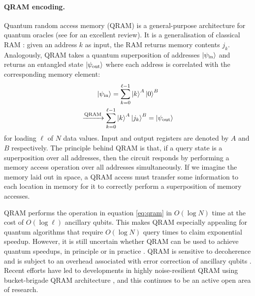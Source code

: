 \documentclass[10pt]{iopart}
\begin{document}
\paragraph{QRAM encoding.} Quantum random access memory (QRAM) is a general-purpose architecture for quantum oracles (see \cite{Jaques2023} for an excellent review). It is a generalisation of classical RAM \cite{Giovannetti2008,Giovannetti2008a}: given an address $k$ as input, the RAM returns memory contents $j_k$. Analogously, QRAM takes a quantum superposition of addresses $\ket{\psi_\text{in}}$ and returns an entangled state $\ket{\psi_\text{out}}$ where each address is correlated with the corresponding memory element:
\begin{gather}
\ket{\psi_\text{in}} =
\sum_{k=0}^{\ell-1} \ket{k}^A \ket{0}^B \nonumber\\
\xrightarrow{\text{QRAM}}
\sum_{k=0}^{\ell-1} \ket{k}^A \ket{j_k}^B
= \ket{\psi_\text{out}} \label{eq:qram}
\end{gather}
for loading $\ell$ of $N$ data values. Input and output registers are denoted by $A$ and $B$ respectively. The principle behind QRAM is that, if a query state is a superposition over all addresses, then the circuit responds by performing a memory access operation over all addresses simultaneously. If we imagine the memory laid out in space, a QRAM access must transfer some information to each location in memory for it to correctly perform a superposition of memory accesses.

QRAM performs the operation  in equation \eqref{eq:qram} in $O(\log N)$ time at the cost of $O(\log\ell)$ ancillary qubits. This makes QRAM especially appealing for quantum algorithms that require $O(\log N)$ query times to claim exponential speedup. However, it is still uncertain whether QRAM can be used to achieve quantum speedups, in principle or in practice \cite{Aaronson2015,Ciliberto2018}. 
QRAM is sensitive to decoherence \cite{Arunachalam2015} and is subject to an overhead associated with error correction of ancillary qubits \cite{DiMatteo2020}. Recent efforts have led to developments in highly noise-resilient QRAM using bucket-brigade QRAM architecture \cite{Hann2021}, and this continues to be an active open area of research.
\end{document}
